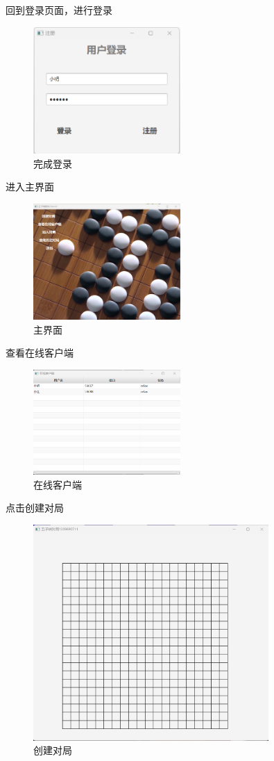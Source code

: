 \documentclass[utf8]{article}
\begin{document}
回到登录页面，进行登录
\begin{figure}[H]
    \centering
    \includegraphics[width=0.5\textwidth]{pictures/13}
    \caption{完成登录}
\end{figure}
进入主界面
\begin{figure}[H]
    \centering
    \includegraphics[width=0.5\textwidth]{pictures/14}
    \caption{主界面}
\end{figure}
查看在线客户端
\begin{figure}[H]
    \centering
    \includegraphics[width=0.5\textwidth]{pictures/17}
    \caption{在线客户端}
\end{figure}
点击创建对局
\begin{figure}[H]
    \centering
    \includegraphics[width=0.8\textwidth]{pictures/18}
    \caption{创建对局}
\end{figure}
\end{document}
